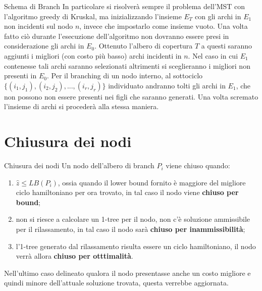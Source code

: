 \documentclass[10pt]{beamer}
\begin{document}
\begin{frame}{Schema di Branch}
    In particolare si risolverà sempre il problema dell'MST con l'algoritmo greedy di Kruskal, ma inizializzando l'insieme $E_T$ con gli archi in $E_1$ non incidenti sul nodo $n$, invece che impostarlo come insieme vuoto. Una volta fatto ciò durante l'esecuzione dell'algoritmo non dovranno essere presi in considerazione gli archi in $E_0$. Ottenuto l'albero di copertura $T$ a questi saranno aggiunti i migliori (con costo più basso) archi incidenti in $n$. Nel caso in cui $E_1$ contenesse tali archi saranno selezionati altrimenti si sceglieranno i migliori non presenti in $E_0$. 
    \newline
    Per il branching di un nodo interno, al sottociclo $\{(i_1, j_1), (i_2,j_2),...,(i_r,j_r)\}$ individuato andranno tolti gli archi in $E_1$, che non possono non essere presenti nei figli che saranno generati. Una volta scremato l'insieme di archi si procederà alla stessa maniera.
\end{frame}

\section{Chiusura dei nodi}
\begin{frame}{Chiusura dei nodi}
    Un nodo dell'albero di branch $P_i$ viene chiuso quando:
    \begin{enumerate}
        \item $\hat{z} \leq LB(P_i)$, ossia quando il lower bound fornito è maggiore del migliore ciclo hamiltoniano per ora trovato, in tal caso il nodo viene \textbf{chiuso per bound};
        \item non si riesce a calcolare un 1-tree per il nodo, non c'è soluzione ammissibile per il rilassamento, in tal caso il nodo sarà \textbf{chiuso per inammissibilità};
        \item l'1-tree generato dal rilassamento risulta essere un ciclo hamiltoniano, il nodo verrà allora \textbf{chiuso per otttimalità}.
    \end{enumerate}
    Nell'ultimo caso delineato qualora il nodo presentasse anche un costo migliore e quindi minore dell'attuale soluzione trovata, questa verrebbe aggiornata.
\end{frame}
\end{document}
